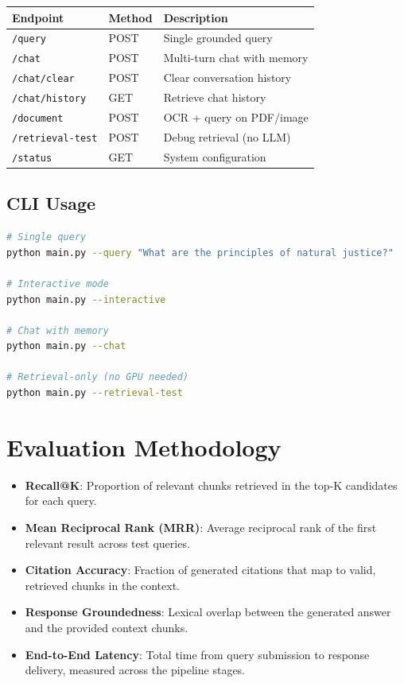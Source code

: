\documentclass[11pt,a4paper]{article}
\begin{document}
\begin{table}[H]
\centering
\begin{tabular}{lll}
\toprule
\textbf{Endpoint} & \textbf{Method} & \textbf{Description} \\
\midrule
\texttt{/query} & POST & Single grounded query \\
\texttt{/chat} & POST & Multi-turn chat with memory \\
\texttt{/chat/clear} & POST & Clear conversation history \\
\texttt{/chat/history} & GET & Retrieve chat history \\
\texttt{/document} & POST & OCR + query on PDF/image \\
\texttt{/retrieval-test} & POST & Debug retrieval (no LLM) \\
\texttt{/status} & GET & System configuration \\
\bottomrule
\end{tabular}
\end{table}

\subsection{CLI Usage}

\begin{lstlisting}[language=bash]
# Single query
python main.py --query "What are the principles of natural justice?"

# Interactive mode
python main.py --interactive

# Chat with memory
python main.py --chat

# Retrieval-only (no GPU needed)
python main.py --retrieval-test
\end{lstlisting}

\section{Evaluation Methodology}

\begin{itemize}[noitemsep]
    \item \textbf{Recall@K}: Proportion of relevant chunks retrieved
        in the top-K candidates for each query.
    \item \textbf{Mean Reciprocal Rank (MRR)}: Average reciprocal rank
        of the first relevant result across test queries.
    \item \textbf{Citation Accuracy}: Fraction of generated citations
        that map to valid, retrieved chunks in the context.
    \item \textbf{Response Groundedness}: Lexical overlap between the
        generated answer and the provided context chunks.
    \item \textbf{End-to-End Latency}: Total time from query submission
        to response delivery, measured across the pipeline stages.
\end{itemize}
\end{document}
